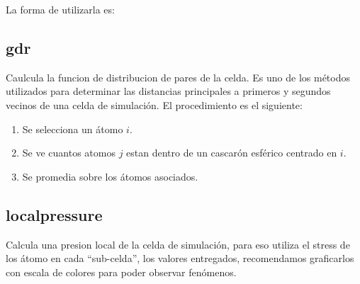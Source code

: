 La forma de utilizarla es:



\subsection{gdr}
Caulcula la funcion de distribucion de pares de la celda. Es uno de los
m\'etodos utilizados para determinar las distancias principales a primeros y
segundos vecinos de una celda de simulaci\'on. El procedimiento es el siguiente:
\begin{enumerate}
 \item Se selecciona un \'atomo $i$.
 \item Se ve cuantos atomos $j$ estan dentro de un cascar\'on esf\'erico
centrado en $i$.
 \item Se promedia sobre los \'atomos asociados.
\end{enumerate}


\subsection{localpressure}

Calcula una presion local de la celda de simulaci\'on, para eso utiliza el
stress de los \'atomo en cada ``sub-celda'', los valores entregados,
recomendamos graficarlos con escala de colores para poder observar fen\'omenos. 

